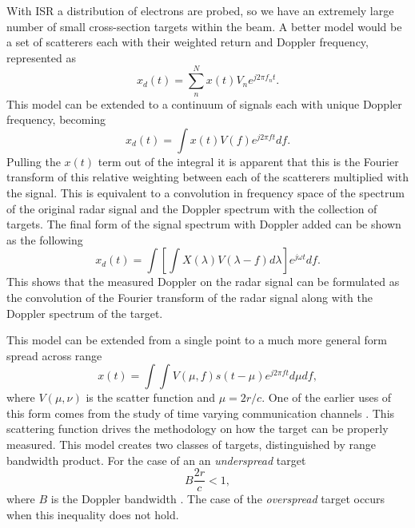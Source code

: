 With ISR a distribution of electrons are probed, so we have an extremely large number of small cross-section targets within the beam. A better model would be a set of scatterers each with their weighted return and Doppler frequency, represented as
\begin{equation}
\label{multiDop}
\displaystyle x_d(t) = \sum_{n}^{N} x(t)V_ne^{j2\pi f_{n} t}.
\end{equation}
This model can be extended to a continuum of signals each with unique Doppler frequency, becoming
\begin{equation}
\label{conDop}
x_d(t) = \int x(t) V(f)e^{j2\pi ft} df.
\end{equation}
Pulling the $x(t)$ term out of the integral it is apparent that this is the Fourier transform of this relative weighting between each of the scatterers multiplied with the signal.  This is equivalent to a convolution in frequency space of the spectrum of the original radar signal and the Doppler spectrum with the collection of targets.  
The final form of the signal spectrum with Doppler added can be shown as the following
\begin{equation}
\label{finalDop}
x_d(t) = \int \left[\int X(\lambda)V(\lambda-f)d\lambda\right] e^{j\omega t}df.
\end{equation}
This shows that the measured Doppler on the radar signal can be formulated as the convolution of the Fourier transform of the radar signal along with the Doppler spectrum of the target.

This model can be extended from a single point to a much more general form spread across range
\begin{equation}
\label{eqn:scateqn}
x(t)= \int \int V(\mu,f)s(t-\mu)e^{j2\pi f t} d \mu df,
\end{equation}
where $V(\mu,\nu)$ is the scatter function and $\mu=2r/c$. One of the earlier uses of this form comes from the study of time varying communication channels \cite{Kailath:1962jx,Kailath:1963gh}. This scattering function drives the methodology on how the target can be properly measured. 
This model creates two classes of targets, distinguished by range bandwidth product. For the case of an an \textit{underspread} target
\begin{equation}
\label{eqn:trp}
B\frac{2r}{c}<1,
\end{equation}
where $B$ is the Doppler bandwidth \cite{Pfander:2015ea}. 
The case of the \textit{overspread} target occurs when this inequality does not hold.

